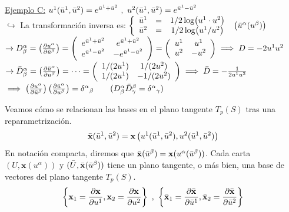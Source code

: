 \begin{mybox}
    \underline{Ejemplo C:} $u^1(\Bar{u}^1,\Bar{u}^2)=e^{\Bar{u}^1+\Bar{u}^2}\ , \ u^2(\Bar{u}^1,\Bar{u}^2)=e^{\Bar{u}^1-\Bar{u}^2}$\\

    $\hookrightarrow$ La transformación inversa es: $ \left \{
    \begin{array}{ccc}
         \Bar{u}^1&=&1/2\log(u^1\cdot u^2)  \\
         \Bar{u}^2&=&1/2\log(u^1/u^2) 
    \end{array} \right . \ \left (\Bar{u}^\alpha (u^\beta)\right )
    $\\
    $
    \rightarrow D^\alpha _\beta =\left ( \pdv{u^\alpha}{\Bar{u}^\beta} \right )=\left ( 
    \begin{array}{cc}
         e^{\Bar{u}^1+\Bar{u}^2}&e^{\Bar{u}^1+\Bar{u}^2}  \\
         e^{\Bar{u}^1-\Bar{u}^2}&-e^{\Bar{u}^1-\Bar{u}^2} 
    \end{array}
    \right ) = \left ( 
    \begin{array}{cc}
         u^1&u^1  \\
         u^2&-u^2 
    \end{array}
    \right )\implies D=-2u^1u^2
    $\\
    $
    \rightarrow \Bar{D}^\alpha_ \beta =\left ( \pdv{\Bar{u}^\alpha}{u^\beta} \right )= \cdots =\left ( 
    \begin{array}{cc}
         1/(2u^1)&1/(2u^2)  \\
         1/(2u^1)&-1/(2u^2) 
    \end{array}
    \right ) \implies \Bar{D}=-\frac{1}{2u^1u^2}
    $\\
    $
    \implies \left ( \pdv{u^\alpha}{\Bar{u}^\beta} \right ) \left ( \pdv{\Bar{u}^\alpha}{u^\beta} \right )=\delta ^\alpha {}_\beta  \qquad(D^\alpha _\beta \Bar{D}^\beta _\gamma =\delta ^\alpha {}_\gamma  )
    $
\end{mybox}

Veamos cómo se relacionan las bases en el plano tangente $T_p(S)$ tras una reparametrización.
$$
\Bar{\mathbf{x}}(\Bar{u}^1,\Bar{u}^2)=\mathbf{x}\left (u^1(\Bar{u}^1,\Bar{u}^2),u^2(\Bar{u}^1,\Bar{u}^2)\right )
$$
En notación compacta, diremos que $\Bar{\mathbf{x}}(\Bar{u}^\beta)=\mathbf{x}(u^\alpha (\Bar{u}^\beta))$. Cada carta $(U,\mathbf{x}(u^\alpha))$ y $(\Bar{U},\Bar{\mathbf{x}}(\Bar{u}^\beta))$ tiene un plano tangente, o más bien, una base de vectores del plano tangente $T_p(S)$.
$$
\left \{ \mathbf{x}_1=\pdv{\mathbf{x}}{u^1},\mathbf{x}_2=\pdv{\mathbf{x}}{u^2} \right \} \ , \ \left \{ \Bar{\mathbf{x}}_1=\pdv{\Bar{\mathbf{x}}}{\Bar{u}^1}, \Bar{\mathbf{x}}_2=\pdv{\Bar{\mathbf{x}}}{\Bar{u}^2} \right \}
$$

